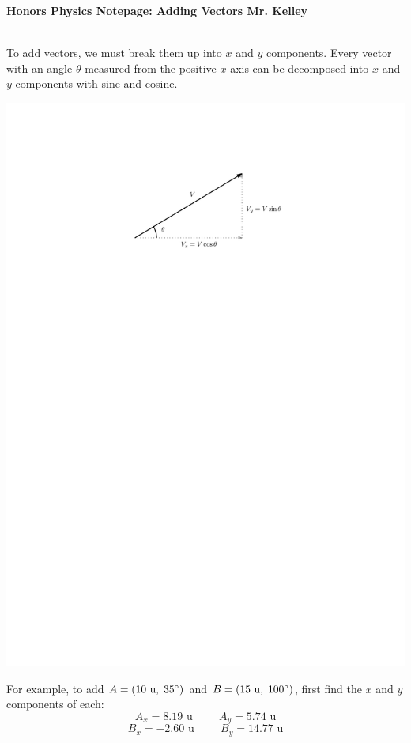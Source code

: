 \documentclass[12pt]{report}
\newcommand{\un}{\mbox{ u}}
\begin{document}
{\bf{Honors Physics} \hfill Notepage: Adding Vectors \hfill {Mr. Kelley}} \\ \\

\vspace{1cm}

\hfill \parbox{12cm}{To add vectors, we must break them up into $x$ and $y$ components.  Every vector with an angle $\theta$ measured from the positive $x$ axis can be decomposed into $x$ and $y$ components with sine and cosine.} \hspace{4cm}

\vspace{.75cm}

\hfill \includegraphics{vecComps} \hfill \mbox{}

\vspace{1cm}

\hspace{2cm} \parbox{9cm}{For example, to add $A = (10 \un, \hspace{.1cm} 35^{\circ})$ and  $B = (15 \un, \hspace{.1cm} 100^{\circ})$, first find the $x$ and $y$ components of each: $$A_x = 8.19 \un \hspace{1cm} A_y = 5.74 \un$$ $$B_x =-2.60 \un \hspace{1cm} B_y = 14.77 \un$$}
\end{document}

